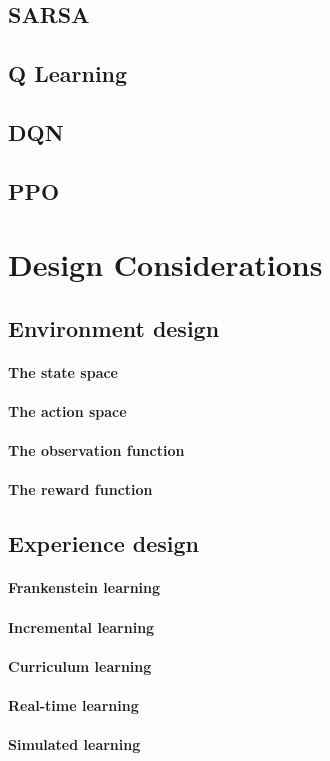 \subsection{SARSA}

\subsection{Q Learning}

\subsection{DQN}

\subsection{PPO}

\section{Design Considerations}

\subsection{Environment design}

\paragraph{The state space}

\paragraph{The action space}

\paragraph{The observation function}

\paragraph{The reward function}

\subsection{Experience design}

\paragraph{Frankenstein learning}

\paragraph{Incremental learning}

\paragraph{Curriculum learning}

\paragraph{Real-time learning}

\paragraph{Simulated learning}
